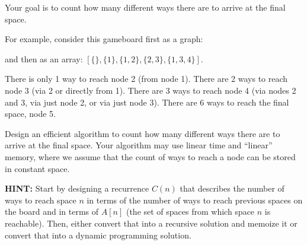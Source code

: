 \documentclass[11pt, oneside]{article}   	%
\theoremstyle{definition}
\theoremstyle{remark}
\begin{document}
Your goal is to count how many different ways there are to arrive at
the final space.

For example, consider this gameboard first as a graph:


and then as an array: $[\{\}, \{1\}, \{1,2\}, \{2,3\}, \{1,3,4\}]$.

There is only 1 way to reach node 2 (from node 1). There are 2 ways to
reach node 3 (via 2 or directly from 1). There are 3 ways to reach
node 4 (via nodes 2 and 3, via just node 2, or via just node 3). There
are 6 ways to reach the final space, node 5.

Design an efficient algorithm to count how many different ways there
are to arrive at the final space. Your algorithm may use linear time
and ``linear'' memory, where we assume that the count of ways to reach a
node can be stored in constant space.

\textbf{HINT:} Start by designing a recurrence $C(n)$ that describes the
number of ways to reach space $n$ in terms of the number of ways to
reach previous spaces on the board and in terms of $A[n]$ (the set of
spaces from which space $n$ is reachable). Then, either convert that
into a recursive solution and memoize it or convert that into a
dynamic programming solution.
\end{document}
